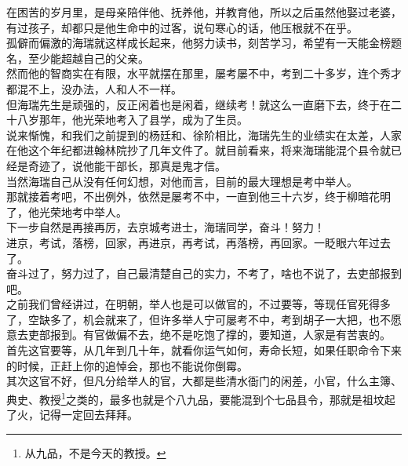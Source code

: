 \begin{multicols}{\theparacolNo}
在困苦的岁月里，是母亲陪伴他、抚养他，并教育他，所以之后虽然他娶过老婆，有过孩子，却都只是他生命中的过客，说句寒心的话，他压根就不在乎。\\

孤僻而偏激的海瑞就这样成长起来，他努力读书，刻苦学习，希望有一天能金榜题名，至少能超越自己的父亲。\\

然而他的智商实在有限，水平就摆在那里，屡考屡不中，考到二十多岁，连个秀才都混不上，没办法，人和人不一样。\\

但海瑞先生是顽强的，反正闲着也是闲着，继续考！就这么一直磨下去，终于在二十八岁那年，他光荣地考入了县学，成为了生员。\\

说来惭愧，和我们之前提到的杨廷和、徐阶相比，海瑞先生的业绩实在太差，人家在他这个年纪都进翰林院抄了几年文件了。就目前看来，将来海瑞能混个县令就已经是奇迹了，说他能干部长，那真是鬼才信。\\

当然海瑞自己从没有任何幻想，对他而言，目前的最大理想是考中举人。\\

那就接着考吧，不出例外，依然是屡考不中，一直到他三十六岁，终于柳暗花明了，他光荣地考中举人。\\

下一步自然是再接再厉，去京城考进士，海瑞同学，奋斗！努力！\\

进京，考试，落榜，回家，再进京，再考试，再落榜，再回家。一眨眼六年过去了。\\

奋斗过了，努力过了，自己最清楚自己的实力，不考了，啥也不说了，去吏部报到吧。\\

之前我们曾经讲过，在明朝，举人也是可以做官的，不过要等，等现任官死得多了，空缺多了，机会就来了，但许多举人宁可屡考不中，考到胡子一大把，也不愿意去吏部报到。有官做偏不去，绝不是吃饱了撑的，要知道，人家是有苦衷的。\\

首先这官要等，从几年到几十年，就看你运气如何，寿命长短，如果任职命令下来的时候，正赶上你的追悼会，那也不能说你倒霉。\\

其次这官不好，但凡分给举人的官，大都是些清水衙门的闲差，小官，什么主簿、典史、教授\footnote{从九品，不是今天的教授。}之类的，最多也就是个八九品，要能混到个七品县令，那就是祖坟起了火，记得一定回去拜拜。\\


\end{multicols}
